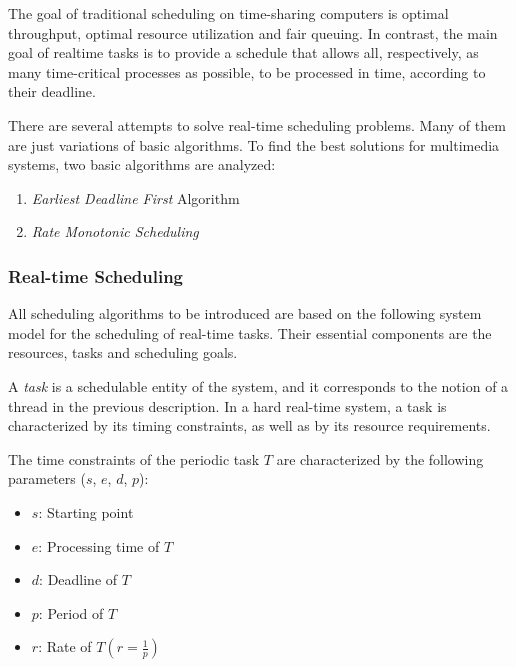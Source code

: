 The goal of traditional scheduling on time-sharing computers is optimal throughput, optimal resource utilization and fair queuing. In contrast, the main goal of realtime tasks is to provide a schedule that allows all, respectively, as many time-critical processes as possible, to be processed in time, according to their deadline. 

There are several attempts to solve real-time scheduling problems. Many of them are just variations of basic algorithms. To find the best solutions for multimedia systems, two basic algorithms are analyzed:

\begin{multicols}{2}
	 \begin{enumerate}
		\item \textit{Earliest Deadline First} Algorithm
		\item \textit{Rate Monotonic Scheduling}
	\end{enumerate}
\end{multicols}


\subsubsection{Real-time Scheduling}
All scheduling algorithms to be introduced are based on the following system model for the scheduling of real-time tasks. Their essential components are the resources, tasks and scheduling goals.

A \textit{task} is a schedulable entity of the system, and it corresponds to the notion of a thread in the previous description. In a hard real-time system, a task is characterized by its timing constraints, as well as by its resource requirements. 

The time constraints of the periodic task $ T $ are characterized by the following parameters  ($ s $, $ e $, $ d $, $ p $):


\begin{multicols}{2}
	\begin{itemize}
		\item $ s $: Starting point
		\item $ e $: Processing time of $ T $
		\item $ d $: Deadline of $ T $
		\item $ p $: Period of $ T $
		\item $ r $: Rate of $ T(r=\frac{1}{p}) $
	\end{itemize}
\end{multicols}


